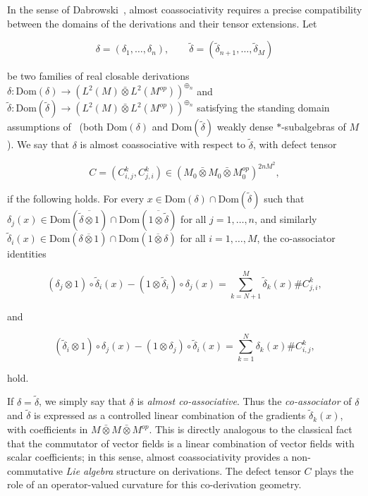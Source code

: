 \documentclass[10pt,a4paper,reqno]{amsart}
\newcommand{\Dom}{\mathrm{Dom}}
\begin{document}
\smallskip

In the sense of Dabrowski~\cite{Dab14v2}, almost coassociativity requires a
precise compatibility between the domains of the derivations and their tensor
extensions.  Let


\[
\delta=(\delta_1,\ldots,\delta_n),\qquad
\tilde\delta=(\tilde\delta_{n+1},\ldots,\tilde\delta_M)
\]


be two families of real closable derivations
$\delta: \Dom(\delta)\to (L^2(M)\bar\otimes L^2(M^{op}))^{\oplus_n}$ and
$\tilde{\delta}: \Dom(\tilde{\delta})\to (L^2(M)\bar\otimes L^2(M^{op}))^{\oplus_n}$
satisfying the standing domain assumptions of~\cite[Definition~20]{Dab14v2}
(both $\Dom({\delta})$ and $\Dom(\tilde{\delta})$ weakly dense $*$-subalgebras
of $M$).  We say that $\delta$ is almost coassociative with respect to
$\tilde\delta$, with defect tensor


\[
C=(C^k_{i,j},C^k_{j,i})\in (M_0\bar\otimes M_0\bar\otimes M^{op}_0)^{2nM^2},
\]


if the following holds.  For every $x\in \Dom(\delta)\cap \Dom(\tilde\delta)$
such that $\delta_j(x)\in \Dom(\overline{\tilde\delta\otimes 1})\cap
\Dom(\overline{1\otimes\tilde\delta})$ for all $j=1,\ldots,n$, and similarly
$\tilde\delta_i(x)\in \Dom(\overline{\delta\otimes 1})\cap
\Dom(\overline{1\otimes\delta})$ for all $i=1,\ldots,M$, the co-associator
identities


\[
(\delta_j\otimes 1)\circ\tilde\delta_i(x)
-
(1\otimes\tilde\delta_i)\circ\delta_j(x)
=
\sum_{k=N+1}^M \tilde\delta_k(x)\# C^k_{j,i},
\]


and


\[
(\tilde\delta_i\otimes 1)\circ\delta_j(x)
-
(1\otimes\delta_j)\circ\tilde\delta_i(x)
=
\sum_{k=1}^N \delta_k(x)\# C^k_{i,j},
\]


hold.

\medskip

If $\delta=\tilde\delta$, we simply say that $\delta$ is
\emph{almost co-associative}.  Thus the \emph{co-associator} of $\delta$ and
$\tilde\delta$ is expressed as a controlled linear combination of the
gradients $\tilde\delta_k(x)$, with coefficients in
$M\bar\otimes M\bar\otimes M^{op}$.  This is directly analogous to the
classical fact that the commutator of vector fields is a linear combination of
vector fields with scalar coefficients; in this sense, almost coassociativity
provides a non-commutative \emph{Lie algebra} structure on derivations.  The
defect tensor $C$ plays the role of an operator-valued curvature for this
co-derivation geometry.
\end{document}
